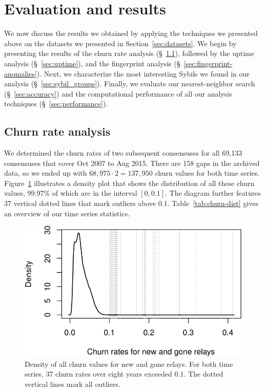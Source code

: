 \section{Evaluation and results}
\label{sec:results}
We now discuss the results we obtained by applying the techniques we presented
above on the datasets we presented in Section~\ref{sec:datasets}.  We begin by
presenting the results of the churn rate analysis (\S~\ref{sec:churn}), followed
by the uptime analysis (\S~\ref{sec:uptime}), and the fingerprint analysis
(\S~\ref{sec:fingerprint-anomalies}).  Next, we characterize the most
interesting Sybils we found in our analysis (\S~\ref{sec:sybil_groups}).
Finally, we evaluate our nearest-neighbor search (\S~\ref{sec:accuracy}) and the
computational performance of all our analysis techniques
(\S~\ref{sec:performance}).

\subsection{Churn rate analysis}
\label{sec:churn}
We determined the churn rates of two subsequent consensuses for all 69,133
consensuses that cover Oct 2007 to Aug 2015.  There are 158 gaps in the
archived data, so we ended up with $68,975 \cdot 2 = 137,950$ churn values for
both time series.  Figure~\ref{fig:churn-density} illustrates a density plot
that shows the distribution of all these churn values, 99.97\% of which are in
the interval $[0, 0.1]$.  The diagram further features 37 vertical dotted lines
that mark outliers above 0.1.  Table~\ref{tab:churn-dist} gives an overview of
our time series statistics.

\begin{figure}[t]
	\centering
	\includegraphics[width=\linewidth]{diagrams/churn-density.pdf}
	\caption{Density of all churn values for new and gone relays.  For both
	time series, 37 churn rates over eight years exceeded 0.1.  The dotted
	vertical lines mark all outliers.}
	\label{fig:churn-density}
\end{figure}

